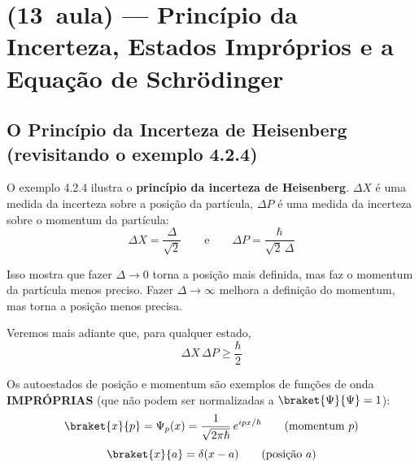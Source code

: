 \section*{(13\textordfeminine\ aula) --- Princípio da Incerteza, Estados Impróprios e a Equação de Schrödinger}

\subsection*{O Princípio da Incerteza de Heisenberg (revisitando o exemplo 4.2.4)}

O exemplo 4.2.4 ilustra o \textbf{princípio da incerteza de Heisenberg}. $\Delta X$ é uma medida da incerteza sobre a posição da partícula, $\Delta P$ é uma medida da incerteza sobre o momentum da partícula:
\begin{equation}
    \Delta X = \frac{\Delta}{\sqrt{2}} \qquad \text{e} \qquad \Delta P = \frac{\hbar}{\sqrt{2}\,\Delta}
\label{eq:aula13_DxDp_exemplo}
\end{equation}

Isso mostra que fazer $\Delta \to 0$ torna a posição mais definida, mas faz o momentum da partícula menos preciso. Fazer $\Delta \to \infty$ melhora a definição do momentum, mas torna a posição menos precisa.

Veremos mais adiante que, para qualquer estado,
\begin{equation}
    \boxed{\Delta X \, \Delta P \geq \frac{\hbar}{2}}
\label{eq:aula13_incerteza_geral}
\end{equation}


\bigskip

Os autoestados de posição e momentum são exemplos de funções de onda \textbf{IMPRÓPRIAS} (que não podem ser normalizadas a $\braket{\Psi}{\Psi} = 1$):
\begin{equation}
    \braket{x}{p} = \Psi_p(x) = \frac{1}{\sqrt{2\pi\hbar}} \, e^{ipx/\hbar} \qquad \text{(momentum $p$)}
\label{eq:aula13_autoestado_p}
\end{equation}
\begin{equation}
    \braket{x}{a} = \delta(x-a) \qquad \text{(posição $a$)}
\label{eq:aula13_autoestado_x}
\end{equation}

